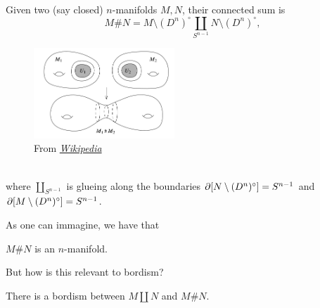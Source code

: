 \begin{defn} Given two (say closed) $n$-manifolds $M,N$, their connected sum is 
    \begin{equation*}
         M\# N=M\setminus(D^{n})^{\circ}\coprod_{S^{n-1}} N\setminus(D^{n})^{\circ},
     \end{equation*}
    \begin{figure}[!ht]
    \centering
    \captionsetup{labelformat=empty, format = hang}
        \begin{measuredfigure}
            \includegraphics[width=5.3cm]{images/Lecture 2/connected sum.png} \caption{\small{From \href{https://en.wikipedia.org/wiki/Connected_sum]}{ \textit{Wikipedia}}}}
        \end{measuredfigure}
    \end{figure}\\
    \noindent where $\coprod_{S^{n-1}}$ is glueing along the boundaries $\partial [ N\setminus (D^{n})^{\circ}]=S^{n-1}$ and $\partial [M\setminus (D^{n})^{\circ}]=S^{n-1}$.\\
\end{defn}


\noindent As one can immagine, we have that


\begin{prop}
    $M\# N$ is an $n$-manifold.
\end{prop}


\noindent But how is this relevant to bordism?


\begin{lem}
    There is a bordism between $M\coprod N$ and $M\# N$.
\end{lem}


